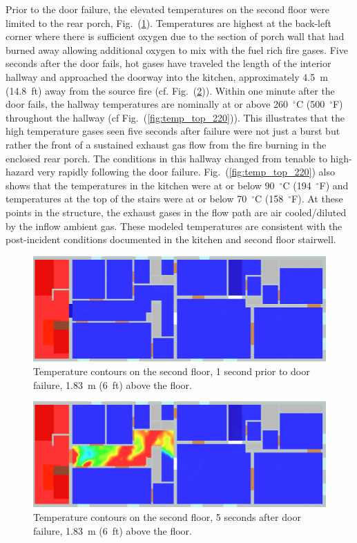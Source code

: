 \documentclass[11pt,oneside]{book}
\begin{document}
Prior to the door failure, the elevated temperatures on the second floor were limited to the rear porch, Fig.~(\ref{fig:temp_top_159}). Temperatures are highest at the back-left corner where there is sufficient oxygen due to the section of porch wall that had burned away allowing additional oxygen to mix with the fuel rich fire gases. Five seconds after the door fails, hot gases have traveled the length of the interior hallway and approached the doorway into the kitchen, approximately 4.5~m (14.8~ft) away from the source fire (cf. Fig.~(\ref{fig:temp_top_165})). Within one minute after the door fails, the hallway temperatures are nominally at or above 260~$^{\circ}$C (500~$^{\circ}$F) throughout the hallway (cf Fig.~(\ref{fig:temp_top_220})). This illustrates that the high temperature gases seen five seconds after failure were not just a burst but rather the front of a sustained exhaust gas flow from the fire burning in the enclosed rear porch. The conditions in this hallway changed from tenable to high-hazard very rapidly following the door failure. Fig.~(\ref{fig:temp_top_220}) also shows that the temperatures in the kitchen were at or below 90~$^{\circ}$C (194~$^{\circ}$F) and temperatures at the top of the stairs were at or below 70~$^{\circ}$C (158~$^{\circ}$F). At these points in the structure, the exhaust gases in the flow path are air cooled/diluted by the inflow ambient gas. These modeled temperatures are consistent with the post-incident conditions documented in the kitchen and second floor stairwell.
\begin{figure}[h!]
\centering
\includegraphics[width=.7\textwidth]{../Figures/west_50th_baseline_top_159_6ft}
 

\caption{Temperature contours on the second floor, 1 second prior to door failure, 1.83~m (6~ft) above the floor.}
\label{fig:temp_top_159}
\end{figure}

\begin{figure}[h!]
\centering
\includegraphics[width=.7\textwidth]{../Figures/west_50th_baseline_top_165_6ft}
 

\caption{Temperature contours on the second floor, 5 seconds after door failure, 1.83~m (6~ft) above the floor.}
\label{fig:temp_top_165}
\end{figure}
\end{document}
